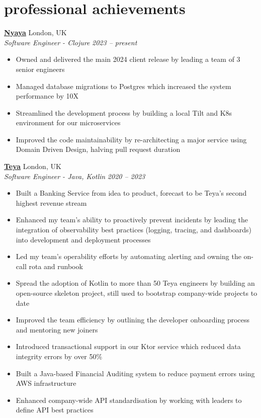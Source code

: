\documentclass[12pt]{article}
\newcommand{\entry}[4]{{{\textbf{#1}}} \hfill #3 \\ #2 \hfill #4}
\begin{document}
    \section{professional achievements}

    \entry{\href{https://nyaya.tech}{Nyaya}}{\textit{Software Engineer - Clojure}}{London, UK}{\textit{2023 -- present}}
    \begin{itemize}[noitemsep,leftmargin=6mm,rightmargin=0mm,topsep=0pt]
        \item Owned and delivered the main 2024 client release by leading a team of 3 senior engineers
        \item Managed database migrations to Postgres which increased the system performance by 10X
        \item Streamlined the development process by building a local Tilt and K8s environment for our microservices
        \item Improved the code maintainability by re-architecting a major service using Domain Driven Design, halving pull request duration
    \end{itemize}

    \smallskip
    \entry{\href{https://teya.com}{Teya}}{\textit{Software Engineer - Java, Kotlin}}{London, UK}{\textit{2020 -- 2023}}
    \begin{itemize}[noitemsep,leftmargin=6mm,rightmargin=0mm,topsep=0pt]
        \item Built a Banking Service from idea to product, forecast to be Teya's second highest revenue stream
        \item Enhanced my team's ability to proactively prevent incidents by leading the integration of observability best practices (logging, tracing, and dashboards) into development and deployment processes
        \item Led my team's operability efforts by automating alerting and owning the on-call rota and runbook
        \item Spread the adoption of Kotlin to more than 50 Teya engineers by building an open-source skeleton project, still used to bootstrap company-wide projects to date
        \item Improved the team efficiency by outlining the developer onboarding process and mentoring new joiners
        \item Introduced transactional support in our Ktor service which reduced data integrity errors by over 50\%
        \item Built a Java-based Financial Auditing system to reduce payment errors using AWS infrastructure
        \item Enhanced company-wide API standardisation by working with leaders to define API best practices
    \end{itemize}
\end{document}
